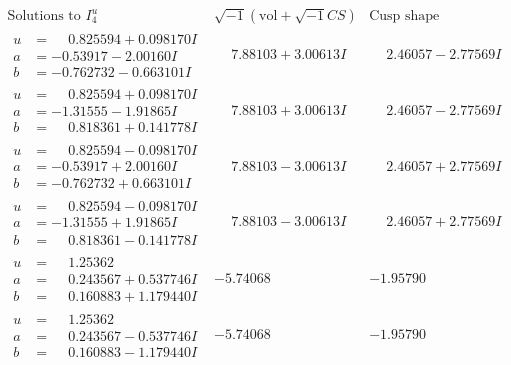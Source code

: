 \documentclass[1p]{elsarticle_modified}
\theoremstyle{definition}
\newcommand{\I}{\sqrt{-1}}
\begin{document}
$$\begin{array}{c|c|c}  
\text{Solutions to }I^u_{4}& \I (\text{vol} + \sqrt{-1}CS) & \text{Cusp shape}\\
 \hline 
\begin{aligned}
u &= \phantom{-}0.825594 + 0.098170 I \\
a &= -0.53917 - 2.00160 I \\
b &= -0.762732 - 0.663101 I\end{aligned}
 & \phantom{-}7.88103 + 3.00613 I & \phantom{-}2.46057 - 2.77569 I \\ \hline\begin{aligned}
u &= \phantom{-}0.825594 + 0.098170 I \\
a &= -1.31555 - 1.91865 I \\
b &= \phantom{-}0.818361 + 0.141778 I\end{aligned}
 & \phantom{-}7.88103 + 3.00613 I & \phantom{-}2.46057 - 2.77569 I \\ \hline\begin{aligned}
u &= \phantom{-}0.825594 - 0.098170 I \\
a &= -0.53917 + 2.00160 I \\
b &= -0.762732 + 0.663101 I\end{aligned}
 & \phantom{-}7.88103 - 3.00613 I & \phantom{-}2.46057 + 2.77569 I \\ \hline\begin{aligned}
u &= \phantom{-}0.825594 - 0.098170 I \\
a &= -1.31555 + 1.91865 I \\
b &= \phantom{-}0.818361 - 0.141778 I\end{aligned}
 & \phantom{-}7.88103 - 3.00613 I & \phantom{-}2.46057 + 2.77569 I \\ \hline\begin{aligned}
u &= \phantom{-}1.25362\phantom{ +0.000000I} \\
a &= \phantom{-}0.243567 + 0.537746 I \\
b &= \phantom{-}0.160883 + 1.179440 I\end{aligned}
 & -5.74068\phantom{ +0.000000I} & -1.95790\phantom{ +0.000000I} \\ \hline\begin{aligned}
u &= \phantom{-}1.25362\phantom{ +0.000000I} \\
a &= \phantom{-}0.243567 - 0.537746 I \\
b &= \phantom{-}0.160883 - 1.179440 I\end{aligned}
 & -5.74068\phantom{ +0.000000I} & -1.95790\phantom{ +0.000000I} \\ \hline\begin{aligned}

\end{aligned}
\end{array}$$
\end{document}

